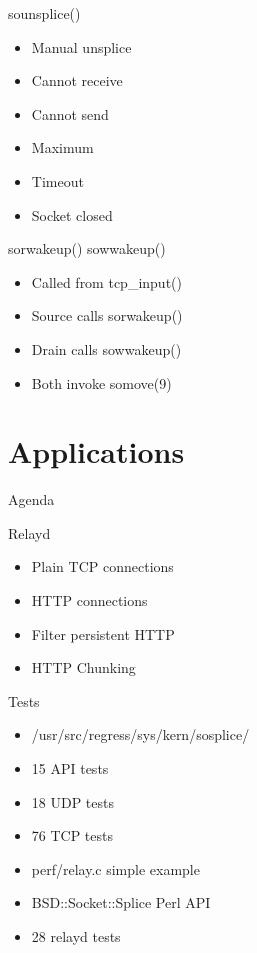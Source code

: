 \documentclass[14pt]{beamer}
\begin{document}
\begin{frame}{sounsplice()}
\begin{itemize}
    \item Manual unsplice
    \item Cannot receive
    \item Cannot send
    \item Maximum
    \item Timeout
    \item Socket closed
\end{itemize}
\end{frame}

\begin{frame}{sorwakeup() sowwakeup()}
\begin{itemize}
    \item Called from tcp\_input()
    \item Source calls sorwakeup()
    \item Drain calls sowwakeup()
    \item Both invoke somove(9)
\end{itemize}
\end{frame}

\section{Applications}

\begin{frame}{Agenda}
\tableofcontents[currentsection]
\end{frame}

\begin{frame}{Relayd}
\begin{itemize}
    \item Plain TCP connections
    \item HTTP connections
    \item Filter persistent HTTP
    \item HTTP Chunking
\end{itemize}
\end{frame}

\begin{frame}{Tests}
\begin{itemize}
    \item /usr/src/regress/sys/kern/sosplice/
    \item 15 API tests
    \item 18 UDP tests
    \item 76 TCP tests
    \item perf/relay.c simple example
    \item BSD::Socket::Splice Perl API
    \item 28 relayd tests
\end{itemize}
\end{frame}
\end{document}
